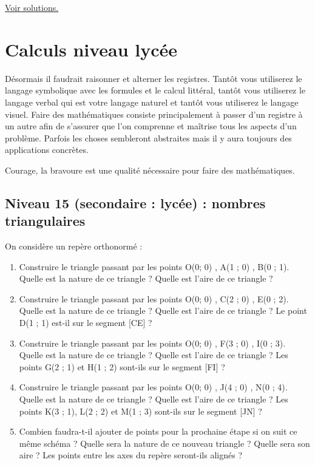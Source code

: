 \documentclass[11pt]{article}
\begin{document}
\hyperref[org58e32e4]{Voir solutions.}

\newpage


\section{Calculs niveau lycée}
\label{sec:orgf0711c1}

Désormais il faudrait raisonner et alterner les registres. Tantôt vous
utiliserez le langage symbolique avec les formules et le calcul
littéral, tantôt vous utiliserez le langage verbal qui est votre
langage naturel et tantôt vous utiliserez le langage visuel. Faire des
mathématiques consiste principalement à passer d'un registre à un
autre afin de s'assurer que l'on comprenne et maîtrise tous les
aspects d'un problème. Parfois les choses sembleront abstraites mais
il y aura toujours des applications concrètes.


Courage, la bravoure est une qualité nécessaire pour faire des
mathématiques.


\newpage


\subsection{Niveau 15 (secondaire : lycée) : nombres triangulaires}
\label{sec:org5a725d1}

\label{org70c6746}

On considère un repère orthonormé :


\begin{enumerate}
\item Construire le triangle passant par les points O(0; 0) , A(1 ; 0) ,
B(0 ; 1). Quelle est la nature de ce triangle ? Quelle est l'aire
de ce triangle ?
\item Construire le triangle passant par les points O(0; 0) , C(2 ; 0) ,
E(0 ; 2). Quelle est la nature de ce triangle ? Quelle est l'aire
de ce triangle ? Le point D(1 ; 1) est-il sur le segment [CE] ?
\item Construire le triangle passant par les points O(0; 0) , F(3 ; 0) ,
I(0 ; 3). Quelle est la nature de ce triangle ? Quelle est l'aire
de ce triangle ? Les points G(2 ; 1) et H(1 ; 2) sont-ils sur le
segment [FI] ?
\item Construire le triangle passant par les points O(0; 0) , J(4 ; 0) ,
N(0 ; 4). Quelle est la nature de ce triangle ? Quelle est l'aire
de ce triangle ? Les points K(3 ; 1), L(2 ; 2) et M(1 ; 3) sont-ils
sur le segment [JN] ?
\item Combien faudra-t-il ajouter de points pour la prochaine étape si on
suit ce même schéma ? Quelle sera la nature de ce nouveau triangle
? Quelle sera son aire ? Les points entre les axes du repère
seront-ils alignés ?
\end{enumerate}
\end{document}
